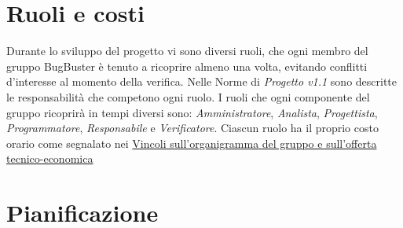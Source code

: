 \documentclass[11pt,a4paper]{article}
\begin{document}
\section{Ruoli e costi}
Durante lo sviluppo del progetto vi sono diversi ruoli, che ogni membro del gruppo BugBuster è tenuto a ricoprire almeno una volta, evitando conflitti d’interesse al momento della verifica. Nelle Norme di \textit{Progetto v1.1} sono descritte le responsabilità che competono ogni ruolo. I ruoli che ogni componente del gruppo ricoprirà in tempi diversi sono: \textit{Amministratore}, \textit{Analista}, \textit{Progettista}, \textit{Programmatore}, \textit{Responsabile} e \textit{Verificatore}.
Ciascun ruolo ha il proprio costo orario come segnalato nei 
\href{http://www.math.unipd.it/~tullio/IS-1/2015/Progetto/PD01b.html}{Vincoli sull’organigramma del gruppo e sull’offerta tecnico-economica}

\section{Pianificazione}
\end{document}
